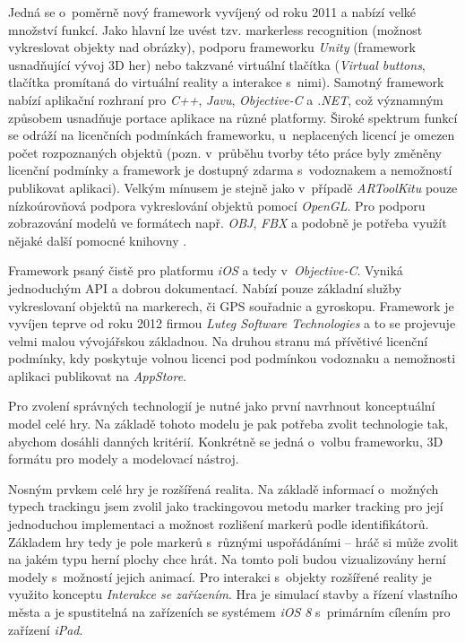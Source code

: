 \documentclass[twoside,12pt]{article}
\begin{document}
Jedná se o~poměrně nový framework vyvíjený od roku 2011 a nabízí velké množství funkcí. Jako hlavní lze uvést tzv. markerless recognition (možnost vykreslovat objekty nad obrázky), podporu frameworku \textit{Unity} (framework usnadňující vývoj 3D her) nebo takzvané virtuální tlačítka (\textit{Virtual buttons}, tlačítka promítaná do virtuální reality a interakce s~nimi). Samotný framework nabízí aplikační rozhraní pro \textit{C++}, \textit{Javu}, \textit{Objective-C} a \textit{.NET}, což významným způsobem usnadňuje portace aplikace na různé platformy. Široké spektrum funkcí se odráží na licenčních podmínkách frameworku, u~neplacených licencí je omezen počet rozpoznaných objektů (pozn. v~průběhu tvorby této práce byly změněny licenční podmínky a framework je dostupný zdarma s~vodoznakem a nemožností publikovat aplikaci). Velkým mínusem je stejně jako v~případě \textit{ARToolKitu} pouze nízkoúrovňová podpora vykreslování objektů pomocí \textit{OpenGL}. Pro podporu zobrazování modelů ve formátech např. \textit{OBJ}, \textit{FBX} a podobně je potřeba využít nějaké další pomocné knihovny \cite{vuforia_3dformats}.

Framework psaný čistě pro platformu \textit{iOS} a tedy v~\textit{Objective-C}. Vyniká jednoduchým API a dobrou dokumentací. Nabízí pouze základní služby vykreslovaní objektů na markerech, či GPS souřadnic a gyroskopu. Framework je vyvíjen teprve od roku 2012 firmou \textit{Luteg Software Technologies} a to se projevuje velmi malou vývojářskou základnou. Na druhou stranu má přívětivé licenční podmínky, kdy poskytuje volnou licenci pod podmínkou vodoznaku a nemožnosti aplikaci publikovat na \textit{AppStore}. 

\newpage
{}
Pro zvolení správných technologií je nutné jako první navrhnout konceptuální model celé hry. Na základě tohoto modelu je pak potřeba zvolit technologie tak, abychom dosáhli danných kritérií. Konkrétně se jedná o~volbu frameworku, 3D formátu pro modely a modelovací nástroj.

Nosným prvkem celé hry je rozšířená realita. Na základě informací o~možných typech trackingu jsem zvolil jako trackingovou metodu marker tracking pro její jednoduchou implementaci a možnost rozlišení markerů podle identifikátorů. Základem hry tedy je pole markerů s~různými uspořádáními -- hráč si může zvolit na jakém typu herní plochy chce hrát. Na tomto poli budou vizualizovány herní modely s~možností jejich animací. Pro interakci s~objekty rozšířené reality je využito konceptu \textit{Interakce se zařízením}. Hra je simulací stavby a řízení vlastního města a je spustitelná na zařízeních se systémem \textit{iOS 8} s~primárním cílením pro zařízení \textit{iPad}. 
\end{document}
